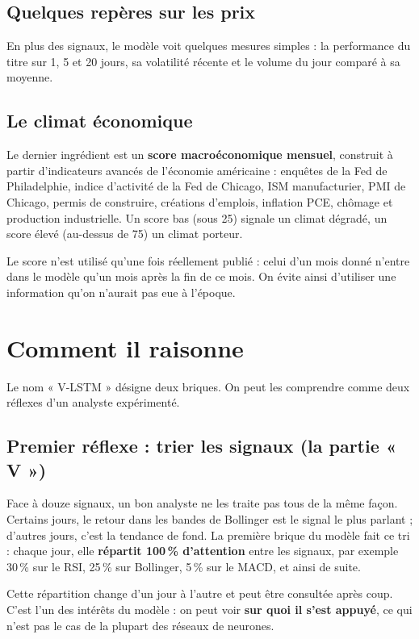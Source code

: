 \documentclass[11pt,a4paper]{article}
\begin{document}
\subsection{Quelques repères sur les prix}
En plus des signaux, le modèle voit quelques mesures simples : la performance du titre
sur 1, 5 et 20 jours, sa volatilité récente et le volume du jour comparé à sa moyenne.

\subsection{Le climat économique}
Le dernier ingrédient est un \textbf{score macroéconomique mensuel}, construit à partir
d'indicateurs avancés de l'économie américaine : enquêtes de la Fed de Philadelphie,
indice d'activité de la Fed de Chicago, ISM manufacturier, PMI de Chicago, permis de
construire, créations d'emplois, inflation PCE, chômage et production industrielle. Un
score bas (sous 25) signale un climat dégradé, un score élevé (au-dessus de 75) un climat
porteur.

Le score n'est utilisé qu'une fois réellement publié : celui d'un mois donné n'entre dans
le modèle qu'un mois après la fin de ce mois. On évite ainsi d'utiliser une information
qu'on n'aurait pas eue à l'époque.

\section{Comment il raisonne}
Le nom « V-LSTM » désigne deux briques. On peut les comprendre comme deux réflexes d'un
analyste expérimenté.

\subsection{Premier réflexe : trier les signaux (la partie « V »)}
Face à douze signaux, un bon analyste ne les traite pas tous de la même façon. Certains
jours, le retour dans les bandes de Bollinger est le signal le plus parlant ; d'autres
jours, c'est la tendance de fond. La première brique du modèle fait ce tri : chaque jour,
elle \textbf{répartit 100\,\% d'attention} entre les signaux, par exemple 30\,\% sur le RSI,
25\,\% sur Bollinger, 5\,\% sur le MACD, et ainsi de suite.

Cette répartition change d'un jour à l'autre et peut être consultée après coup. C'est
l'un des intérêts du modèle : on peut voir \textbf{sur quoi il s'est appuyé}, ce qui n'est
pas le cas de la plupart des réseaux de neurones.
\end{document}
